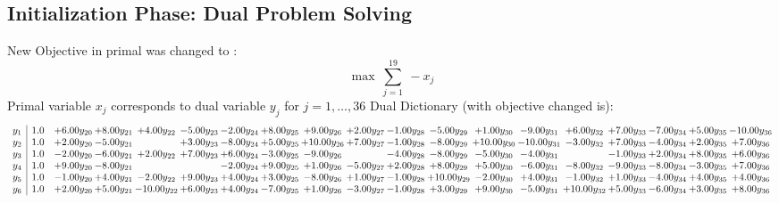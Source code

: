 \documentclass[9pt]{article}
\begin{document}
\subsection{Initialization Phase: Dual Problem Solving}
New Objective in primal was changed to : \[ \max\ \sum_{j=1}^{19}\ - x_j \] 
Primal variable $x_j$ corresponds to dual variable $y_j$ for $j = 1,\ldots,36$
Dual Dictionary (with objective changed is): 
\[\begin{array}{c| c c@{\hskip 2pt} c@{\hskip 2pt} c@{\hskip 2pt} c@{\hskip 2pt} c@{\hskip 2pt} c@{\hskip 2pt} c@{\hskip 2pt} c@{\hskip 2pt} c@{\hskip 2pt} c@{\hskip 2pt} c@{\hskip 2pt} c@{\hskip 2pt} c@{\hskip 2pt} c@{\hskip 2pt} c@{\hskip 2pt} c@{\hskip 2pt} c@{\hskip 2pt} }
 y_{1}   &  1.0 & +  6.00 y_{20} & +  8.00 y_{21} & +  4.00 y_{22} & -5.00 y_{23} & -2.00 y_{24} & +  8.00 y_{25} & +  9.00 y_{26} & +  2.00 y_{27} & -1.00 y_{28} & -5.00 y_{29} & +  1.00 y_{30} & -9.00 y_{31} & +  6.00 y_{32} & +  7.00 y_{33} & -7.00 y_{34} & +  5.00 y_{35} & -10.00 y_{36}\\
 y_{2}   &  1.0 & +  2.00 y_{20} & -5.00 y_{21} &   & +  3.00 y_{23} & -8.00 y_{24} & +  5.00 y_{25} & + 10.00 y_{26} & +  7.00 y_{27} & -1.00 y_{28} & -8.00 y_{29} & + 10.00 y_{30} & -10.00 y_{31} & -3.00 y_{32} & +  7.00 y_{33} & -4.00 y_{34} & +  2.00 y_{35} & +  7.00 y_{36}\\
 y_{3}   &  1.0 & -2.00 y_{20} & -6.00 y_{21} & +  2.00 y_{22} & +  7.00 y_{23} & +  6.00 y_{24} & -3.00 y_{25} & -9.00 y_{26} &   & -4.00 y_{28} & -8.00 y_{29} & -5.00 y_{30} & -4.00 y_{31} &   & -1.00 y_{33} & +  2.00 y_{34} & +  8.00 y_{35} & +  6.00 y_{36}\\
 y_{4}   &  1.0 & +  9.00 y_{20} & -8.00 y_{21} &    &   & -2.00 y_{24} & +  9.00 y_{25} & +  1.00 y_{26} & -5.00 y_{27} & +  2.00 y_{28} & +  8.00 y_{29} & +  5.00 y_{30} & -6.00 y_{31} & -8.00 y_{32} & -9.00 y_{33} & -8.00 y_{34} & -3.00 y_{35} & +  7.00 y_{36}\\
 y_{5}   &  1.0 & -1.00 y_{20} & +  4.00 y_{21} & -2.00 y_{22} & +  9.00 y_{23} & +  4.00 y_{24} & +  3.00 y_{25} & -8.00 y_{26} & +  1.00 y_{27} & -1.00 y_{28} & + 10.00 y_{29} & -2.00 y_{30} & +  4.00 y_{31} & -1.00 y_{32} & +  1.00 y_{33} & -4.00 y_{34} & +  4.00 y_{35} & +  4.00 y_{36}\\
 y_{6}   &  1.0 & +  2.00 y_{20} & +  5.00 y_{21} & -10.00 y_{22} & +  6.00 y_{23} & +  4.00 y_{24} & -7.00 y_{25} & +  1.00 y_{26} & -3.00 y_{27} & -1.00 y_{28} & +  3.00 y_{29} & +  9.00 y_{30} & -5.00 y_{31} & + 10.00 y_{32} & +  5.00 y_{33} & -6.00 y_{34} & +  3.00 y_{35} & +  8.00 y_{36}\\

\end{array}\]
\end{document}
